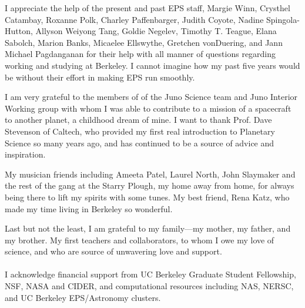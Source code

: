 \documentclass[phd,12pt]{ucbthesis}
\begin{document}
\begin{frontmatter}
\begin{acknowledgements}
I appreciate the help of the present and past EPS staff, Margie Winn, Crysthel
Catambay, Roxanne Polk, Charley Paffenbarger, Judith Coyote, Nadine Spingola-Hutton,
Allyson Weiyong Tang, Goldie Negelev, Timothy T. Teague, Elana Sabolch, Marion Banks,
Micaelee Ellswythe, Gretchen vonDuering, and Jann Michael Pagdanganan for their help
with all manner of questions regarding working and studying at Berkeley.  I cannot
imagine how my past five years would be without their effort in making EPS run
smoothly.

I am very grateful to the members of of the Juno Science team and Juno Interior
Working group with whom I was able to contribute to a mission of a spacecraft to
another planet, a childhood dream of mine.
I want to thank Prof. Dave Stevenson of Caltech, who provided my first real introduction
to Planetary Science so many years ago, and has continued to be a source of advice
and inspiration.

My musician friends including Ameeta Patel, Laurel North, John
Slaymaker and the rest of the gang at the Starry Plough, my home away from home, for
always being there to lift my spirits with some tunes.
My best friend, Rena Katz, who made my time living in Berkeley so wonderful.

Last but not the least, I am grateful to my family---my mother, my father, and my
brother. My first teachers and collaborators, to whom I owe my love of science, and
who are source of unwavering love and support. \\\\

I acknowledge financial support from UC Berkeley Graduate Student Fellowship, NSF,
NASA and CIDER, and computational resources including NAS, NERSC, and UC Berkeley
EPS/Astronomy clusters.

\end{acknowledgements}

\end{frontmatter}

\pagestyle{headings}














%
%
%

%
%



\end{document}
